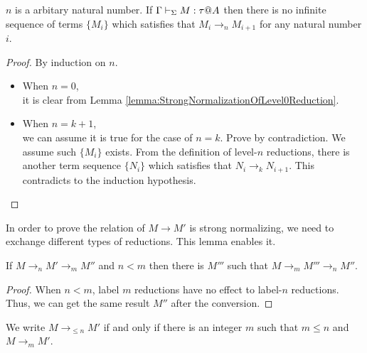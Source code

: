 \begin{lemma}
    \label{lemma:StrongNormalizationOfLevelnReduction}
    \( n \) is a arbitary natural number.
    If \( \G\V M:\tau@A \) then there is no infinite sequence of terms $\{M_i\}$ which satisfies that $M_i \longrightarrow_n M_{i+1}$ for any natural number \( i \).
\end{lemma}

\begin{proof}
    By induction on \( n \).
    \begin{itemize}
        \item When \( n = 0 \), \\
            it is clear from Lemma \ref{lemma:StrongNormalizationOfLevel0Reduction}.
        \item When \( n = k + 1 \), \\
            we can assume it is true for the case of \( n = k \).  Prove by
            contradiction. We assume such \(\{M_i\}\) exists. From the
            definition of level-\( n \) reductions, there is another term
            sequence \( \{ N_i \} \) which satisfies that \( N_i
            \longrightarrow_k N_{i+1} \). This contradicts to the induction
            hypothesis.
    \end{itemize}
\end{proof}

In order to prove the relation of \( M \longrightarrow M' \) is strong
normalizing, we need to exchange different types of reductions. This lemma
enables it.

\begin{lemma}
    \label{lemma:CommutablityOfLeveledReductions}
    If \( M \longrightarrow_n M' \longrightarrow_m M'' \) and \( n < m \) then there is \( M''' \) such that \( M \longrightarrow_m M''' \longrightarrow_n M'' \).
\end{lemma}

\begin{proof}
    When \( n < m \), label \( m \)
    reductions have no effect to label-\( n \) reductions. Thus, we can get the
    same result \( M'' \) after the conversion.
\end{proof}

\begin{definition}[]
We write \( M \longrightarrow_{\le n} M' \) if and only if there is an integer \( m \) such that \( m \le n \) and \( M \longrightarrow_m M' \).
\end{definition}

